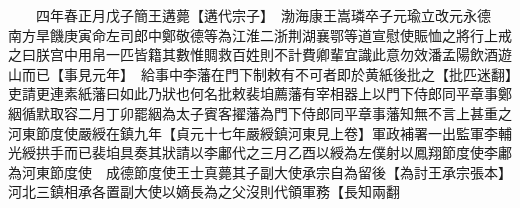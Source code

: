 　　四年春正月戊子簡王遘薨【遘代宗子】　渤海康王嵩璘卒子元瑜立改元永德　南方旱饑庚寅命左司郎中鄭敬德等為江淮二浙荆湖襄鄂等道宣慰使賑恤之將行上戒之曰朕宫中用帛一匹皆籍其數惟賙救百姓則不計費卿輩宜識此意勿效潘孟陽飲酒遊山而已【事見元年】　給事中李藩在門下制敕有不可者即於黄紙後批之【批匹迷翻】吏請更連素紙藩曰如此乃狀也何名批敕裴垍薦藩有宰相器上以門下侍郎同平章事鄭絪循默取容二月丁卯罷絪為太子賓客擢藩為門下侍郎同平章事藩知無不言上甚重之　河東節度使嚴綬在鎮九年【貞元十七年嚴綬鎮河東見上卷】軍政補署一出監軍李輔光綬拱手而已裴垍具奏其狀請以李鄘代之三月乙酉以綬為左僕射以鳳翔節度使李鄘為河東節度使　成德節度使王士真薨其子副大使承宗自為留後【為討王承宗張本】河北三鎮相承各置副大使以嫡長為之父沒則代領軍務【長知兩翻